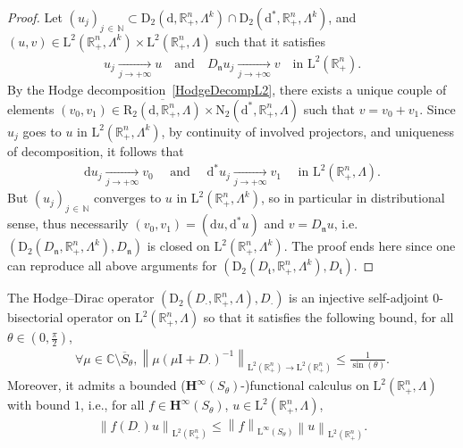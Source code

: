 \documentclass[10pt]{amsart}
\theoremstyle{definition}\newtheorem{defi}[theo]{Definition}\newtheorem{rema}[theo]{Remark}\newtheorem{exam}[theo]{Example}\newtheorem{exem}[theo]{Example}\newtheorem{nota}[theo]{Notation}
\newcommand{\bbR}{\mathbb{R}}
\newcommand{\bbC}{\mathbb{C}}
\newcommand{\bbN}{\mathbb{N}}
\newcommand{\rmd}{\mathrm{d}}
\newcommand{\rmD}{\mathrm{D}}
\newcommand{\rmL}{\mathrm{L}}
\newcommand{\rmR}{\mathrm{R}}
\newcommand{\rmN}{\mathrm{N}}
\newcommand{\rmI}{\mathrm{I}}
\newcommand{\bfH}{\mathbf{H}}
\newcommand{\fkn}{\mathfrak{n}}
\newcommand{\fkt}{\mathfrak{t}}
\let\oldforall\forall
\renewcommand*{\forall}{\mathrel{\oldforall}}
\begin{document}
\begin{proof}
Let $(u_j)_{j\,\in\,\bbN}\subset \rmD_2({\rmd},\bbR^n_+,\Lambda^k)\cap\rmD_2({\rmd^\ast},\bbR^n_+,\Lambda^k)$, and $(u,v)\in\rmL^2(\bbR^n_+, \Lambda^k)\times\rmL^2(\bbR^n_+, \Lambda)$ such that it satisfies
\begin{align*}
u_j \xrightarrow[j\rightarrow +\infty]{} u \quad\text{and}\quad D_\fkn u_j \xrightarrow[j\rightarrow +\infty]{} v \quad\text{in } \rmL^2\left(\bbR^n_+\right) .
\end{align*}
By the Hodge decomposition~\eqref{HodgeDecompL2}, there exists a unique couple of elements $({v}_{0},{v}_{1})\in \overline{\rmR_2({\rmd},\bbR^n_+,\Lambda)}\times \rmN _2({\rmd^\ast},\bbR^n_+,\Lambda)$ such that $v={v}_{0}+{v}_{1}$. Since $u_j$ goes to $u$ in $\rmL^2(\bbR^n_+,\Lambda^k)$, by continuity of involved projectors, and uniqueness of decomposition, it follows that
\begin{align*}
\rmd u_j \xrightarrow[j\rightarrow +\infty]{} v_0 \quad\text{ and }\quad \rmd^\ast u_j \xrightarrow[j\rightarrow +\infty]{} v_1 \quad\text{ in } \rmL^2\left(\bbR^n_+,\Lambda\right) .
\end{align*}
But $(u_j)_{j\,\in\,\bbN }$ converges to $u$ in $\rmL^2(\bbR^n_+,\Lambda^k)$, so in particular in distributional sense, thus necessarily $(v_0,v_1)=(\rmd u,\rmd^\ast u)$ and $v=D_\fkn u$, i.e.  $(\rmD_2(D_{\fkn},\bbR^n_+,\Lambda^k),D_{\fkn})$ is closed on $\rmL^2(\bbR^n_+,\Lambda^k)$. The proof ends here since one can reproduce all above arguments for $(\rmD_2(D_{\fkt},\bbR^n_+,\Lambda^k),D_{\fkt})$.
\end{proof}


\begin{prop}\label{prop:HodgeDiracL2Rn+}
The Hodge--Dirac operator $(\rmD_2(D_\cdot,\bbR^n_+,\Lambda),D_\cdot)$ is an injective self-adjoint $0$-bisectorial operator on $\rmL^2(\bbR^n_+,\Lambda)$ so that it satisfies the following bound, for all $\theta\in (0,\frac{\pi}{2})$,
\begin{align}\label{eq:resolvEstDiracL2}
\forall \mu\in\bbC\setminus \overline{S}_\theta, \left\| \mu(\mu\rmI + D_\cdot)^{-1}\right\|_{\rmL^2\left(\bbR^n_+\right)\rightarrow \rmL^2\left(\bbR^n_+\right)}\leqslant \frac{1}{\sin(\theta)} .
\end{align}
Moreover, it admits a bounded ($\bfH^\infty(S_\theta)$-)functional calculus on $\rmL^2(\bbR^n_+,\Lambda)$ with bound $1$, i.e., for all $f\in\bfH^\infty(S_\theta)$, $u\in\rmL^2(\bbR^n_+,\Lambda)$,
\begin{align}
\left\| f(D_\cdot)u\right\|_{\rmL^2\left(\bbR^n_+\right)}\leqslant \left\| f\right\|_{\rmL^\infty(S_\theta)}\left\| u\right\|_{\rmL^2\left(\bbR^n_+\right)}.
\end{align}
\end{prop}
\end{document}

